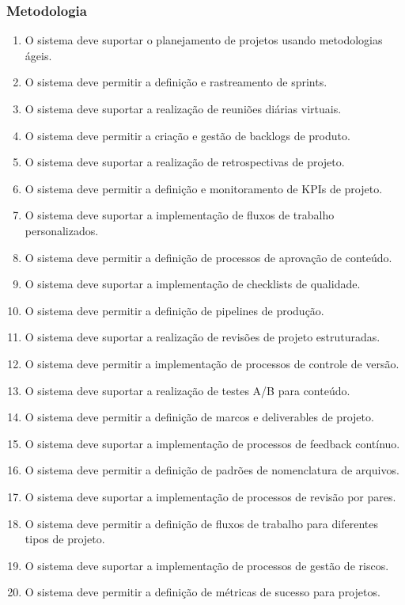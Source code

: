 \subsubsection{Metodologia}
\begin{enumerate}
  \item O sistema deve suportar o planejamento de projetos usando metodologias ágeis.
  \item O sistema deve permitir a definição e rastreamento de sprints.
  \item O sistema deve suportar a realização de reuniões diárias virtuais.
  \item O sistema deve permitir a criação e gestão de backlogs de produto.
  \item O sistema deve suportar a realização de retrospectivas de projeto.
  \item O sistema deve permitir a definição e monitoramento de KPIs de projeto.
  \item O sistema deve suportar a implementação de fluxos de trabalho personalizados.
  \item O sistema deve permitir a definição de processos de aprovação de conteúdo.
  \item O sistema deve suportar a implementação de checklists de qualidade.
  \item O sistema deve permitir a definição de pipelines de produção.
  \item O sistema deve suportar a realização de revisões de projeto estruturadas.
  \item O sistema deve permitir a implementação de processos de controle de versão.
  \item O sistema deve suportar a realização de testes A/B para conteúdo.
  \item O sistema deve permitir a definição de marcos e deliverables de projeto.
  \item O sistema deve suportar a implementação de processos de feedback contínuo.
  \item O sistema deve permitir a definição de padrões de nomenclatura de arquivos.
  \item O sistema deve suportar a implementação de processos de revisão por pares.
  \item O sistema deve permitir a definição de fluxos de trabalho para diferentes tipos de projeto.
  \item O sistema deve suportar a implementação de processos de gestão de riscos.
  \item O sistema deve permitir a definição de métricas de sucesso para projetos.
\end{enumerate}

